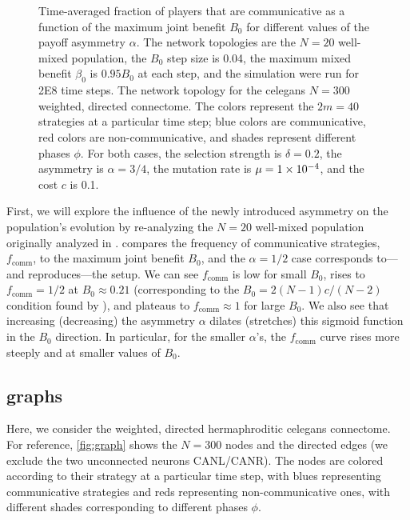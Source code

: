 \documentclass[pdflatex,lineno,referee,sn-mathphys-ay]{sn-jnl}
\begin{document}
\begin{figure}
  \centering
  
  \caption{
    Time-averaged fraction of players that are communicative as a function
    of the maximum joint benefit $B_0$
    for different values of the payoff asymmetry $\alpha$.
    The network topologies are the
    $N=20$ well-mixed population,
    the $B_0$ step size is \num{0.04},
    the maximum mixed benefit $\beta_0$ is $\num{0.95} B_0$ at each step,
    and the simulation were run for \num{2E8} time steps.
    The network topology for the \gls{celegans}
    $N=300$ weighted, directed connectome.
    The colors represent the $2m = 40$ strategies
    at a particular time step;
    blue colors are communicative,
    red colors are non-communicative,
    and shades represent different phases $\phi$.
    For both cases,
    the selection strength is $\delta=0.2$,
    the asymmetry is $\alpha=3/4$,
    the mutation rate is $\mu=\num{1E-4}$,
    and
    the cost $c$ is \num{0.1}.
  }
  \label{fig:graph_multi-comm-frac}
\end{figure}

First, we will explore the influence of the newly introduced asymmetry
on the population's evolution by
re-analyzing the $N=20$ well-mixed population
originally analyzed in \citet{tripp2022evolutionary}.
 compares the frequency of communicative strategies,
$f_{\text{comm}}$, to the maximum joint benefit $B_0$,
and the $\alpha=1/2$ case corresponds to---and reproduces---the
\citet{tripp2022evolutionary} setup.
We can see $f_{\text{comm}}$ is low for small $B_0$,
rises to $f_{\text{comm}} = 1/2$ at $B_0 \approx 0.21$
(corresponding to the $B_0 = 2 (N-1) c/(N-2)$ condition
found by \citet{tripp2022evolutionary}),
and plateaus to $f_{\text{comm}} \approx 1$ for large $B_0$.
We also see that increasing (decreasing)
the asymmetry $\alpha$ dilates (stretches) this sigmoid function
in the $B_0$ direction.
In particular, for the smaller $\alpha$'s, the $f_{\text{comm}}$ curve
rises more steeply and at smaller values of $B_0$.

\subsection{ graphs}
\label{sec:elegans_graph}

Here, we consider the weighted, directed hermaphroditic \gls{celegans} connectome.
For reference, \cref{fig:graph} shows the $N = 300$ nodes and the directed edges
(we exclude the two unconnected neurons CANL/CANR).
The nodes are colored according to their strategy at a particular time step,
with blues representing communicative strategies
and reds representing non-communicative ones,
with different shades corresponding to different phases $\phi$.
\end{document}
